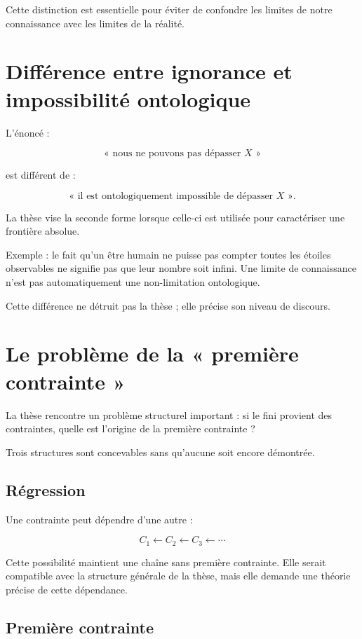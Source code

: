 \documentclass[11pt,a4paper]{article}
\begin{document}
Cette distinction est essentielle pour éviter de confondre les limites de notre connaissance avec les limites de la réalité.

\section{Différence entre ignorance et impossibilité ontologique}

L'énoncé :

\[
\text{« nous ne pouvons pas dépasser }X\text{ »}
\]

est différent de :

\[
\text{« il est ontologiquement impossible de dépasser }X\text{ »}.
\]

La thèse vise la seconde forme lorsque celle-ci est utilisée pour caractériser une frontière absolue.

Exemple : le fait qu'un être humain ne puisse pas compter toutes les étoiles observables ne signifie pas que leur nombre soit infini. Une limite de connaissance n'est pas automatiquement une non-limitation ontologique.

Cette différence ne détruit pas la thèse ; elle précise son niveau de discours.

\section{Le problème de la « première contrainte »}

La thèse rencontre un problème structurel important : si le fini provient des contraintes, quelle est l'origine de la première contrainte ?

Trois structures sont concevables sans qu'aucune soit encore démontrée.

\subsection{Régression}

Une contrainte peut dépendre d'une autre :

\[
C_1 \leftarrow C_2 \leftarrow C_3 \leftarrow \cdots
\]

Cette possibilité maintient une chaîne sans première contrainte. Elle serait compatible avec la structure générale de la thèse, mais elle demande une théorie précise de cette dépendance.

\subsection{Première contrainte}
\end{document}
